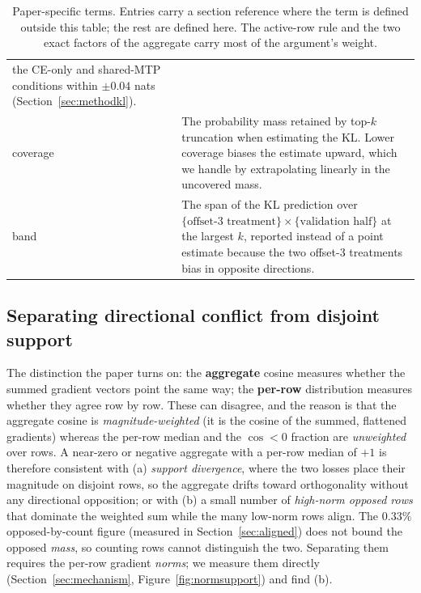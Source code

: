 \begin{table}[t]
\begin{tabular}{p{}p{}}
the CE-only and shared-MTP conditions within $\pm 0.04$ nats
(Section~\ref{sec:methodkl}). \\[2pt]
coverage &
The probability mass retained by top-$k$ truncation when estimating the KL. Lower
coverage biases the estimate upward, which we handle by extrapolating linearly in
the uncovered mass. \\[2pt]
band &
The span of the KL prediction over $\{\text{offset-3 treatment}\} \times
\{\text{validation half}\}$ at the largest $k$, reported instead of a point
estimate because the two offset-3 treatments bias in opposite directions. \\
\bottomrule
\end{tabular}
\caption{Paper-specific terms. Entries carry a section reference where the term
is defined outside this table; the rest are defined here. The active-row rule and
the two exact factors of the aggregate carry most of the argument's weight.}
\label{tab:notation}
\end{table}

\subsection{Separating directional conflict from disjoint support}
\label{sec:dirsupport}
The distinction the paper turns on: the \textbf{aggregate} cosine measures whether
the summed gradient vectors point the same way; the \textbf{per-row} distribution
measures whether they agree row by row. These can disagree, and the reason is
that the aggregate cosine is \emph{magnitude-weighted} (it is the cosine of the
summed, flattened gradients) whereas the per-row median and the $\cos<0$ fraction
are \emph{unweighted} over rows. A near-zero or negative aggregate with a per-row
median of $+1$ is therefore consistent with (a) \emph{support divergence}, where
the two losses place their magnitude on disjoint rows, so the aggregate drifts
toward orthogonality without any directional opposition; or with (b) a small
number of \emph{high-norm opposed rows} that dominate the weighted sum while the
many low-norm rows align. The $0.33\%$ opposed-by-count figure (measured in
Section~\ref{sec:aligned}) does not bound the
opposed \emph{mass}, so counting rows cannot distinguish the two. Separating them
requires the per-row gradient \emph{norms}; we measure them directly
(Section~\ref{sec:mechanism}, Figure~\ref{fig:normsupport}) and find (b).

